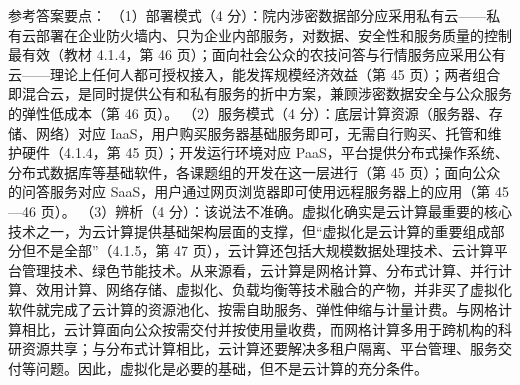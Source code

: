 \documentclass[a4paper,11pt]{article}
\begin{document}

\q 参考答案要点：
（1）部署模式（4 分）：院内涉密数据部分应采用私有云——私有云部署在企业防火墙内、只为企业内部服务，对数据、安全性和服务质量的控制最有效（教材 4.1.4，第 46 页）；面向社会公众的农技问答与行情服务应采用公有云——理论上任何人都可授权接入，能发挥规模经济效益（第 45 页）；两者组合即混合云，是同时提供公有和私有服务的折中方案，兼顾涉密数据安全与公众服务的弹性低成本（第 46 页）。
（2）服务模式（4 分）：底层计算资源（服务器、存储、网络）对应 IaaS，用户购买服务器基础服务即可，无需自行购买、托管和维护硬件（4.1.4，第 45 页）；开发运行环境对应 PaaS，平台提供分布式操作系统、分布式数据库等基础软件，各课题组的开发在这一层进行（第 45 页）；面向公众的问答服务对应 SaaS，用户通过网页浏览器即可使用远程服务器上的应用（第 45—46 页）。
（3）辨析（4 分）：该说法不准确。虚拟化确实是云计算最重要的核心技术之一，为云计算提供基础架构层面的支撑，但“虚拟化是云计算的重要组成部分但不是全部”（4.1.5，第 47 页），云计算还包括大规模数据处理技术、云计算平台管理技术、绿色节能技术。从来源看，云计算是网格计算、分布式计算、并行计算、效用计算、网络存储、虚拟化、负载均衡等技术融合的产物，并非买了虚拟化软件就完成了云计算的资源池化、按需自助服务、弹性伸缩与计量计费。与网格计算相比，云计算面向公众按需交付并按使用量收费，而网格计算多用于跨机构的科研资源共享；与分布式计算相比，云计算还要解决多租户隔离、平台管理、服务交付等问题。因此，虚拟化是必要的基础，但不是云计算的充分条件。
\end{document}
